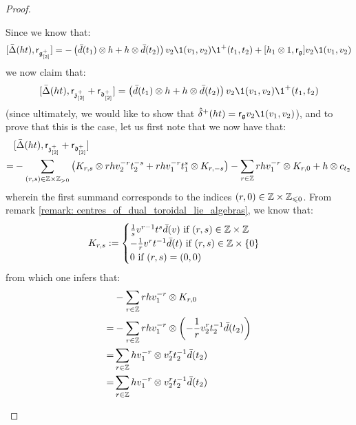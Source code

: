 \begin{proof}
\begin{enumerate}
                    Since we know that:
                        $$[\bar{\Delta}(ht), \sfr_{\g_{[2]}^+}] = -\left( \bar{d}(t_1) \tensor h + h \tensor \bar{d}(t_2) \right) v_2 \1(v_1, v_2) \1^+(t_1, t_2) + [h_1 \tensor 1, \sfr_{\g}] v_2 \1(v_1, v_2)$$
                    we now claim that:
                        $$[\bar{\Delta}(ht), \sfr_{\z_{[2]}^+} + \sfr_{\d_{[2]}^+}] = \left( \bar{d}(t_1) \tensor h + h \tensor \bar{d}(t_2) \right) v_2 \1(v_1, v_2) \1^+(t_1, t_2)$$
                    (since ultimately, we would like to show that $\hat{\delta}^+(ht) = \sfr_{\g} v_2 \1(v_1, v_2)$), and to prove that this is the case, let us first note that we now have that:
                        $$
                            \begin{aligned}
                                & [\bar{\Delta}(ht), \sfr_{\z_{[2]}^+} + \sfr_{\d_{[2]}^+}]
                                \\
                                = & -\sum_{(r, s) \in \Z \x \Z_{> 0}} \left( K_{r, s} \tensor r h v_2^{-r} t_2^{-s} + r h v_1^{-r} t_1^s \tensor K_{r, -s} \right) - \sum_{r \in \Z} r h v_1^{-r} \tensor K_{r, 0} + h \tensor c_{t_2}
                            \end{aligned}
                        $$
                    wherein the first summand corresponds to the indices $(r, 0) \in \Z \x \Z_{\leq 0}$. From remark \ref{remark: centres_of_dual_toroidal_lie_algebras}, we know that:
                        $$
                            K_{r, s} :=
                            \begin{cases}
                                \text{$\frac1s v^{r - 1} t^s \bar{d}(v)$ if $(r, s) \in \Z \x \Z$}
                                \\
                                \text{$-\frac1r v^r t^{-1} \bar{d}(t)$ if $(r, s) \in \Z \x \{0\}$}
                                \\
                                \text{$0$ if $(r, s) = (0, 0)$}
                            \end{cases}
                        $$
                    from which one infers that:
                        $$
                            \begin{aligned}
                                & -\sum_{r \in \Z} r h v_1^{-r} \tensor K_{r, 0}
                                \\
                                = & -\sum_{r \in \Z} r h v_1^{-r} \tensor \left( -\frac1r v_2^r t_2^{-1} \bar{d}(t_2) \right)
                                \\
                                = & \sum_{r \in \Z} h v_1^{-r} \tensor v_2^r t_2^{-1} \bar{d}(t_2)
                                \\
                                = & \sum_{r \in \Z} h v_1^{-r} \tensor v_2^r t_2^{-1} \bar{d}(t_2)
                            \end{aligned}
                        $$
                        

\end{enumerate}
\end{proof}
